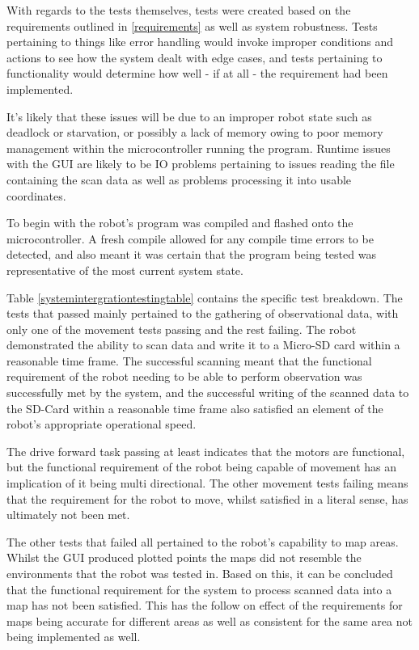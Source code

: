 			With regards to the tests themselves, tests were created based on the requirements outlined in \ref{requirements} as well as system robustness. Tests pertaining to things like error handling would invoke improper conditions and actions to see how the system dealt with edge cases, and tests pertaining to functionality would determine how well - if at all - the requirement had been implemented.
			
			It's likely that these issues will be due to an improper robot state such as deadlock or starvation, or possibly a lack of memory owing to poor memory management within the microcontroller running the program. Runtime issues with the GUI are likely to be IO problems pertaining to issues reading the file containing the scan data as well as problems processing it into usable coordinates. 
			
			To begin with the robot's program was compiled and flashed onto the microcontroller. A fresh compile allowed for any compile time errors to be detected, and also meant it was certain that the program being tested was representative of the most current system state.
			
			Table \ref{systemintergrationtestingtable} contains the specific test breakdown. The tests that passed mainly pertained to the gathering of observational data, with only one of the movement tests passing and the rest failing. The robot demonstrated the ability to scan data and write it to a Micro-SD card within a reasonable time frame. The successful scanning meant that the functional requirement of the robot needing to be able to perform observation was successfully met by the system, and the successful writing of the scanned data to the SD-Card within a reasonable time frame also satisfied an element of the robot's appropriate operational speed. 
			
			The drive forward task passing at least indicates that the motors are functional, but the functional requirement of the robot being capable of movement has an implication of it being multi directional. The other movement tests failing means that the requirement for the robot to move, whilst satisfied in a literal sense, has ultimately not been met.
			
			The other tests that failed all pertained to the robot's capability to map areas. Whilst the GUI produced plotted points the maps did not resemble the environments that the robot was tested in. Based on this, it can be concluded that the functional requirement for the system to process scanned data into a map has not been satisfied. This has the follow on effect of the requirements for maps being accurate for different areas as well as consistent for the same area not being implemented as well.
			

